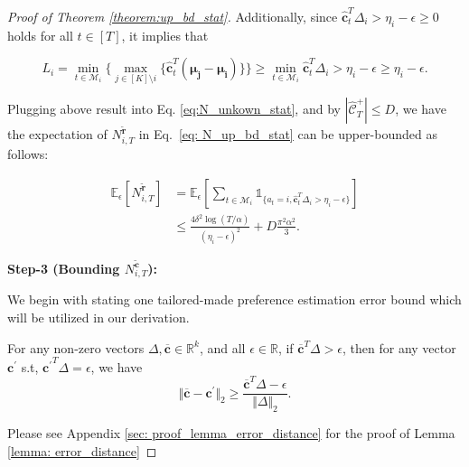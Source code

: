 \begin{proof}[Proof of Theorem \ref{theorem:up_bd_stat}]
Additionally, since $\hat{\boldsymbol{c}}_{t}^{T} \Delta_{i} > \eta_i - \epsilon \geq 0$ holds for all $t \in [T]$, it implies that

\[
L_i = \min_{t \in \mathcal{M}_i} \{ \max_{j \in [K] \setminus i } \{\boldsymbol{\hat{c}}_t^T (\boldsymbol{\boldsymbol{\mu}_j - \boldsymbol{\mu}_{i} } )\} \} 
\geq 
\min_{t \in \mathcal{M}_i} \hat{\boldsymbol{c}}_{t}^{T} \Delta_{i} 
>
\eta_i - \epsilon
\geq
\eta_i - \epsilon
.
\]

Plugging above result into Eq. \ref{eq:N_unkown_stat}, and by $|\hat{\mathcal{C}}^{+}_{T}| \leq D$,
we have the expectation of $N_{i,T}^{\widetilde{\boldsymbol{r}}}$ in Eq.~\ref{eq: N_up_bd_stat} can be upper-bounded as follows:

\begin{equation}
\begin{aligned}
\label{eq: upbd_term_1_stat}
\mathbb{E}_{\epsilon} \left[N_{i,T}^{\widetilde{\boldsymbol{r}}} \right]
& = 
\mathbb{E}_{\epsilon} \left[ \sum_{t \in \mathcal{M}_i} \mathds{1}_{\{a_t = i, \hat{\boldsymbol{c}}_{t}^{T} \Delta_{i} > \eta_{i} - \epsilon\}} \right]  \\
& \leq 
\frac{4 \delta^2 \log (T/\alpha)}{(\eta_{i} - \epsilon)^2}
+
D \frac{\pi^2 \alpha^2}{3}.
\end{aligned}
\end{equation}


\textbf{Step-3 (Bounding $N_{i,T}^{\widetilde{\boldsymbol{c}}}$):}

We begin with stating one tailored-made preference estimation error bound which will be utilized in our derivation.

\begin{lemma}
\label{lemma: error_distance}
For any non-zero vectors $\Delta, \boldsymbol{\overline{c}} \in \mathbb{R}^k$, and all $\epsilon \in \mathbb{R}$, if $\boldsymbol{\overline{c}}^T \Delta > \epsilon$, then for any vector $\boldsymbol{c^{\prime}}$ s.t, $\boldsymbol{c^{\prime}}^T \Delta = \epsilon$, we have
\[
\Vert \boldsymbol{\overline{c}}- \boldsymbol{c^{\prime}}  \Vert_2 \geq \frac{ \boldsymbol{\overline{c}}^T \Delta  - \epsilon}{\Vert \Delta \Vert_2}.
\]
\end{lemma}

Please see Appendix \ref{sec: proof_lemma_error_distance} for the proof of Lemma \ref{lemma: error_distance}




\end{proof}
